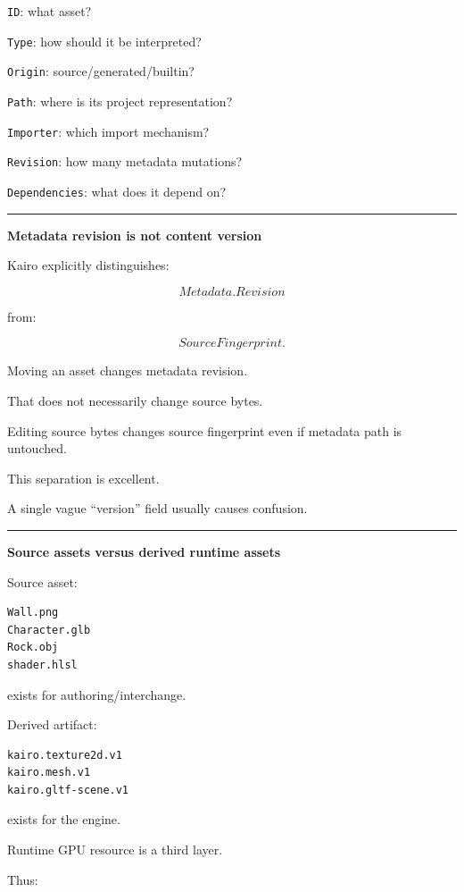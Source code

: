 \texttt{ID}: what asset?

\texttt{Type}: how should it be interpreted?

\texttt{Origin}: source/generated/builtin?

\texttt{Path}: where is its project representation?

\texttt{Importer}: which import mechanism?

\texttt{Revision}: how many metadata mutations?

\texttt{Dependencies}: what does it depend on?

\begin{center}\rule{0.5\linewidth}{0.5pt}\end{center}

\textbf{Metadata revision is not content version}

Kairo explicitly distinguishes:

\[
Metadata.Revision
\]

from:

\[
SourceFingerprint.
\]

Moving an asset changes metadata revision.

That does not necessarily change source bytes.

Editing source bytes changes source fingerprint even if metadata path is untouched.

This separation is excellent.

A single vague ``version'' field usually causes confusion.

\begin{center}\rule{0.5\linewidth}{0.5pt}\end{center}

\textbf{Source assets versus derived runtime assets}

Source asset:

\begin{verbatim}
Wall.png
Character.glb
Rock.obj
shader.hlsl
\end{verbatim}

exists for authoring/interchange.

Derived artifact:

\begin{verbatim}
kairo.texture2d.v1
kairo.mesh.v1
kairo.gltf-scene.v1
\end{verbatim}

exists for the engine.

Runtime GPU resource is a third layer.

Thus:

